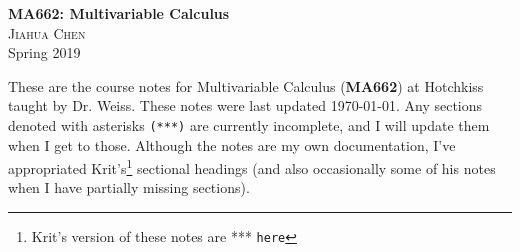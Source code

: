 \documentclass[12pt, letterpaper, dvipsnames]{article} %
\begin{document}
\begin{center}\large \textbf{MA662: Multivariable Calculus} \\[12pt]

	\small \textsc{Jiahua Chen}	\\[12pt]
	
	Spring 2019\end{center}
	\vspace{2em}
	
	\begin{changemargin}{.7in}{.7in} 
	These are the course notes for Multivariable Calculus (\textbf{MA662}) at Hotchkiss taught by Dr. Weiss. These notes were last updated \today. Any sections denoted with asterisks \texttt{(***)} are currently incomplete, and I will update them when I get to those. Although the notes are my own documentation, I've appropriated Krit's\footnote{Krit's version of these notes are *** \texttt{here}} sectional headings (and also occasionally some of his notes when I have partially missing sections). 
	\end{changemargin}
	

\newpage
\tableofcontents

\newpage























\end{document}
